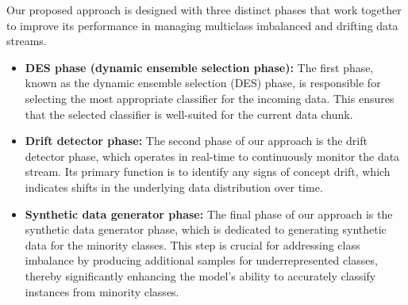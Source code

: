 Our proposed approach is designed with three distinct phases that work together to improve its performance in managing multiclass imbalanced and drifting data streams. 
\begin{itemize}
	\item \textbf{DES phase (dynamic ensemble selection phase):} The first phase, known as the dynamic ensemble selection (DES) phase, is responsible for selecting the most appropriate classifier for the incoming data. This ensures that the selected classifier is well-suited for the current data chunk.
	\item \textbf{Drift detector phase:} The second phase of our approach is the drift detector phase, which operates in real-time to continuously monitor the data stream. Its primary function is to identify any signs of concept drift, which indicates shifts in the underlying data distribution over time.
	\item \textbf{Synthetic data generator phase:} The final phase of our approach is the synthetic data generator phase, which is dedicated to generating synthetic data for the minority classes. This step is crucial for addressing class imbalance by producing additional samples for underrepresented classes, thereby significantly enhancing the model's ability to accurately classify instances from minority classes.
\end{itemize}

